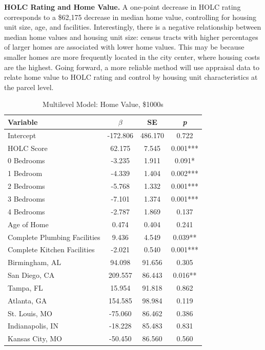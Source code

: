\documentclass[paper=letter, fontsize=12pt]{scrartcl} %
\begin{document}
\begin{table}
	\textbf{HOLC Rating and Home Value.} A one-point decrease in HOLC rating corresponds to a \$62,175 decrease in median home value, controlling for housing unit size, age, and facilities. Interestingly, there is a negative relationship between median home values and housing unit size: census tracts with higher percentages of larger homes are associated with lower home values. This may be because smaller homes are more frequently located in the city center, where housing costs are the highest. Going forward, a more reliable method will use appraisal data to relate home value to HOLC rating and control by housing unit characteristics at the parcel level.
	\caption{Multilevel Model: Home Value, \$1000s}
	\begin{center}
		\begin{tabular}{|| l | c c c ||}
			\hline
			Variable & $\beta$ & SE & \textit{p} \\
			\hline \hline
			Intercept & -172.806 & 486.170 & 0.722 \\
			\hline
			HOLC Score & 62.175 & 7.545 & 0.001*** \\
			\hline
			0 Bedrooms & -3.235 & 1.911 & 0.091* \\
			\hline
			1 Bedroom & -4.339 & 1.404 & 0.002*** \\
			\hline
			2 Bedrooms & -5.768 & 1.332 & 0.001*** \\
			\hline
			3 Bedrooms & -7.101 & 1.374 & 0.001*** \\
			\hline
			4 Bedrooms & -2.787 & 1.869 & 0.137 \\
			\hline
			Age of Home & 0.474 & 0.404 & 0.241 \\
			\hline
			Complete Plumbing Facilities & 9.436 & 4.549 & 0.039** \\
			\hline
			Complete Kitchen Facilities & -2.021 & 0.540 & 0.001*** \\
			\hline
			Birmingham, AL & 94.098 & 91.656 & 0.305 \\
			\hline
			San Diego, CA & 209.557 & 86.443 & 0.016** \\
			\hline
			Tampa, FL & 15.954 & 91.818 & 0.862 \\
			\hline
			Atlanta, GA & 154.585 & 98.984 & 0.119 \\
			\hline
			St. Louis, MO & -75.060 & 86.462 & 0.386 \\
			\hline
			Indianapolis, IN & -18.228 & 85.483 & 0.831 \\
			\hline
			Kansas City, MO & -50.450 & 86.560 & 0.560 \\

\end{tabular}
\end{center}
\end{table}
\end{document}
